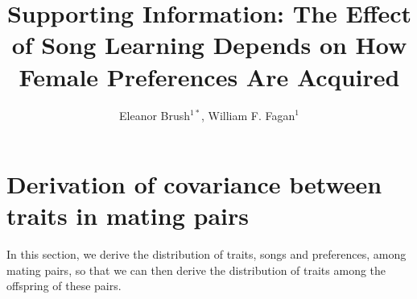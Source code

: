 \documentclass{article}
\title{Supporting Information: The Effect of Song Learning Depends on How Female Preferences Are Acquired}
\author{Eleanor Brush$^{1\ast}$, William F. Fagan$^{1}$}
\date{}
\begin{document}
\maketitle

\tableofcontents

\renewcommand{\thesection}{S\arabic{section}}
\renewcommand{\thesubsection}{S\arabic{subsection}}
\renewcommand{\theequation}{S\arabic{equation}}
\renewcommand{\thetable}{S\arabic{table}}
\renewcommand{\thefigure}{S\arabic{figure}}


\section{Derivation of covariance between traits in mating pairs \label{cov_derivation}}
In this section, we derive the distribution of traits, songs and preferences, among mating pairs, so that we can then derive the distribution of traits among the offspring of these pairs. 
\end{document}
